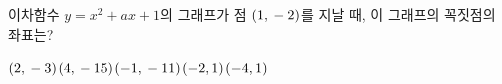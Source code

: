 이차함수 $y=x^2+ax+1$의 그래프가 점 $(1{,}\mkern3mu -2)$를 지날 때, 이 그래프의 꼭짓점의 좌표는? 
\begin{choices32}{$(2{,}\mkern3mu -3)$}{$(4{,}\mkern3mu -15)$}{$(-1{,}\mkern3mu -11)$}{$(-2{,}\mkern3mu 1)$}{$(-4{,}\mkern3mu 1)$}\end{choices32}
